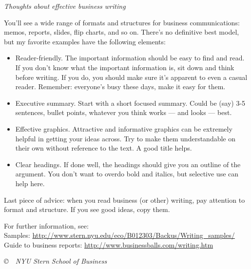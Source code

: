 \documentclass[letterpaper,12pt]{article}
\begin{document}
\newpage
{\it Thoughts about effective business writing}

You'll see a wide range of formats and structures 
for business communications:
memos, reports, slides, flip charts, and so on.
There's no definitive best model,
but my favorite examples have the following elements:  
%
\begin{itemize}
\item Reader-friendly.  
The important information should be easy to find and read.  
If you don't know what the important information is, 
sit down and think before writing. 
If you do, you should make sure it's apparent to even a casual reader.
Remember:  everyone's busy these days, make it easy for them.  

\item Executive summary.  Start with a short focused summary.  Could be (say) 3-5 sentences, bullet points, whatever you think works 
     --- and looks --- best.  
    
\item Effective graphics.  Attractive and informative graphics 
can be extremely helpful in getting your ideas across.
Try to make them understandable
on their own without reference to the text.  A good title helps.  

\item Clear headings.  If done well, the headings should 
give you an outline of the argument.  
You don't want to overdo bold and italics, 
but selective use can help here.  

\end{itemize}
%
Last piece of advice:  when you read business (or other) writing, 
pay attention to format and structure.  
If you see good ideas, copy them.  

For further information, see:   \\ 
Samples:  \url{http://www.stern.nyu.edu/eco/B012303/Backus/Writing_samples/} \\
Guide to business reports:  \url{http://www.businessballs.com/writing.htm} 


\vfill \centerline{\it \copyright \ \number\year \ 
NYU Stern School of Business}
\end{document}
